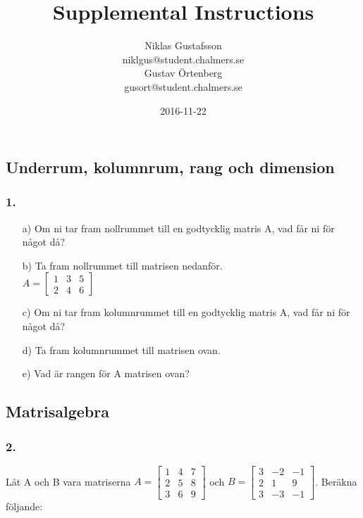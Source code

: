 \documentclass{article}
\title{Supplemental Instructions}
\author{Niklas Gustafsson \\ 
		\small{niklgus@student.chalmers.se} \\
		Gustav Örtenberg \\ 
		\small{gusort@student.chalmers.se}
}
\date{
      2016-11-22
     }
\begin{document}
\maketitle

\subsection*{Underrum, kolumnrum, rang och dimension}
\subsubsection*{1.}
\begin{itemize}
	\item[a) ] Om ni tar fram nollrummet till en godtycklig matris A, vad får ni för något då?
	\item[b) ] Ta fram nollrummet till matrisen nedanför. \\
	$A=\begin{bmatrix}1 & 3 & 5\\ 2 & 4 & 6 \end{bmatrix}$
	\item[c) ] Om ni tar fram kolumnrummet till en godtycklig matris A, vad får ni för något då?
	\item[d) ] Ta fram kolumnrummet till matrisen ovan. 
	\item[e) ] Vad är rangen för A matrisen ovan? 
\end{itemize}

\subsection*{Matrisalgebra}
\subsubsection*{2.}
Låt A och B vara matriserna $A=\begin{bmatrix}1 & 4 & 7\\ 2 & 5 & 8 \\ 3 & 6 & 9\end{bmatrix}$ och $B=\begin{bmatrix}3 & -2 & -1\\ 2 & 1 & 9 \\ 3 & -3 & -1\end{bmatrix}$. Beräkna följande:
\end{document}
